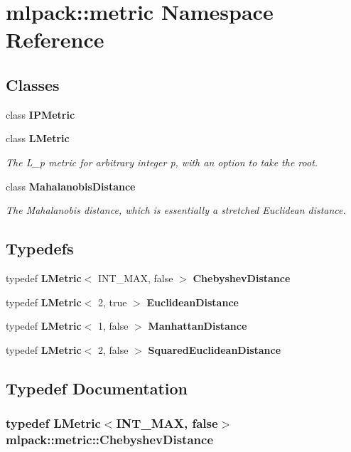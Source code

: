 \section{mlpack\-:\-:metric Namespace Reference}
\label{namespacemlpack_1_1metric}
\subsection*{Classes}
\begin{DoxyCompactItemize}
\item 
class {\bf I\-P\-Metric}
\item 
class {\bf L\-Metric}
\begin{DoxyCompactList}\small\item\em The L\-\_\-p metric for arbitrary integer p, with an option to take the root. \end{DoxyCompactList}\item 
class {\bf Mahalanobis\-Distance}
\begin{DoxyCompactList}\small\item\em The Mahalanobis distance, which is essentially a stretched Euclidean distance. \end{DoxyCompactList}\end{DoxyCompactItemize}
\subsection*{Typedefs}
\begin{DoxyCompactItemize}
\item 
typedef {\bf L\-Metric}$<$ I\-N\-T\-\_\-\-M\-A\-X, false $>$ {\bf Chebyshev\-Distance}
\item 
typedef {\bf L\-Metric}$<$ 2, true $>$ {\bf Euclidean\-Distance}
\item 
typedef {\bf L\-Metric}$<$ 1, false $>$ {\bf Manhattan\-Distance}
\item 
typedef {\bf L\-Metric}$<$ 2, false $>$ {\bf Squared\-Euclidean\-Distance}
\end{DoxyCompactItemize}


\subsection{Typedef Documentation}
\subsubsection[{Chebyshev\-Distance}]{\setlength{\rightskip}{0pt plus 5cm}typedef {\bf L\-Metric}$<$I\-N\-T\-\_\-\-M\-A\-X, false$>$ {\bf mlpack\-::metric\-::\-Chebyshev\-Distance}}\label{namespacemlpack_1_1metric_a112690bd2c4cba99c4c4e7ab2263155e}


